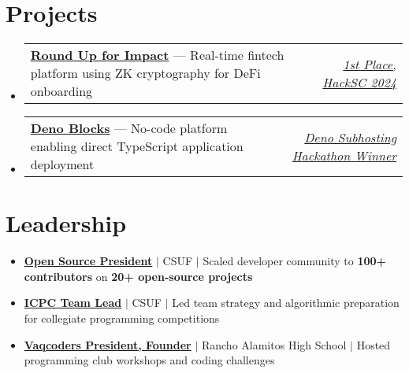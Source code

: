 \documentclass[letterpaper,11pt]{article}
\makeatletter
\newcommand{\resumeItem}[1]{
  \item\small{
    {#1 \vspace{-2pt}}
  }
}
\newcommand{\resumeProjectHeading}[2]{
    \item
    \begin{tabular*}{0.97\textwidth}{l@{\extracolsep{\fill}}r}
      \small#1 & #2 \\
    \end{tabular*}\vspace{-3pt}
}
\newcommand{\resumeSubHeadingListStart}{\begin{itemize}[leftmargin=0.15in, label={}]}
\newcommand{\resumeSubHeadingListEnd}{\end{itemize}}
\makeatother
\begin{document}
\section{Projects}
\resumeSubHeadingListStart
  \resumeProjectHeading
    {\textbf{\href{https://devpost.com/software/rufi}{Round Up for Impact}} --- Real-time fintech platform using ZK cryptography for DeFi onboarding}
    {\emph{\href{https://devpost.com/software/rufi}{1st Place, HackSC 2024}}}
  \resumeProjectHeading
    {\textbf{\href{https://blocks.deno.dev/}{Deno Blocks}} --- No-code platform enabling direct TypeScript application deployment}
    {\emph{\href{https://deno.com/blog/subhosting-hackathon\#winning-submissions}{Deno Subhosting Hackathon Winner}}}
\resumeSubHeadingListEnd

\section{Leadership}
\resumeSubHeadingListStart
  \resumeItem{\textbf{\href{https://github.com/acmcsufoss}{Open Source President}} $|$ CSUF $|$ Scaled developer community to \textbf{100+ contributors} on \textbf{20+ open-source projects}}
  \resumeItem{\textbf{\href{https://acmcsuf.com/blog/322}{ICPC Team Lead}} $|$ CSUF $|$ Led team strategy and algorithmic preparation for collegiate programming competitions}
  \resumeItem{\textbf{\href{https://vaqcoders.github.io/}{Vaqcoders President, Founder}} $|$ Rancho Alamitos High School $|$ Hosted programming club workshops and coding challenges}
\resumeSubHeadingListEnd

\end{document}
